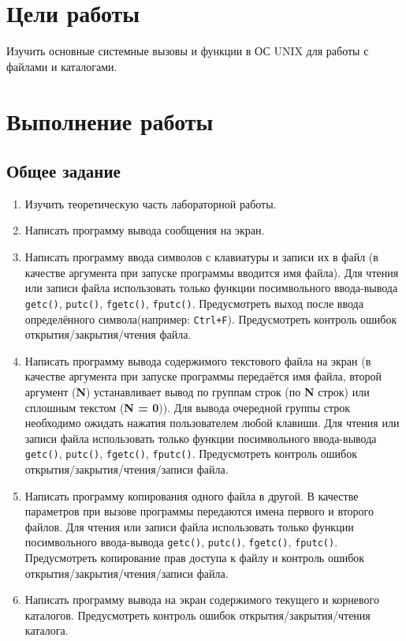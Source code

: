 \section{Цели работы}
\label{sec:target}

Изучить основные системные вызовы и функции в ОС UNIX для работы с файлами и каталогами.

\section{Выполнение работы}
\label{sec:job} 
\subsection{Общее задание}
\label{sec:job:general_task}

\begin{enumerate}[listparindent=\fivecharsapprox]
	\item Изучить теоретическую часть лабораторной работы.
	\item Написать программу вывода сообщения на экран.
	\item Написать программу ввода символов с клавиатуры и записи их в файл (в качестве аргумента при запуске программы вводится имя файла).
Для чтения или записи файла использовать только функции посимвольного ввода-вывода \lstinline{getc()}, \lstinline{putc()}, \lstinline{fgetc()}, \lstinline{fputc()}.
Предусмотреть выход после ввода определённого символа(например: \lstinline{Ctrl+F}).
Предусмотреть контроль ошибок открытия/закрытия/чтения файла.
	\item Написать программу вывода содержимого текстового файла на экран (в качестве аргумента при запуске программы передаётся имя файла, второй аргумент (\textbf{N}) устанавливает вывод по группам строк (по \textbf{N} строк) или сплошным текстом (\textbf{N = 0})).
Для вывода очередной группы строк необходимо ожидать нажатия пользователем любой клавиши.
Для чтения или записи файла использовать только функции посимвольного ввода-вывода \lstinline{getc()}, \lstinline{putc()}, \lstinline{fgetc()}, \lstinline{fputc()}.
Предусмотреть контроль ошибок открытия/закрытия/чтения/записи файла.
	\item Написать программу копирования одного файла в другой.
В качестве параметров при вызове программы передаются имена первого и второго файлов.
Для чтения или записи файла использовать только функции посимвольного ввода-вывода \lstinline{getc()}, \lstinline{putc()}, \lstinline{fgetc()}, \lstinline{fputc()}.
Предусмотреть копирование прав доступа к файлу и контроль ошибок открытия/закрытия/чтения/записи файла.
	\item Написать программу вывода на экран содержимого текущего и корневого каталогов.
Предусмотреть контроль ошибок открытия/закрытия/чтения каталога.

\end{enumerate}

